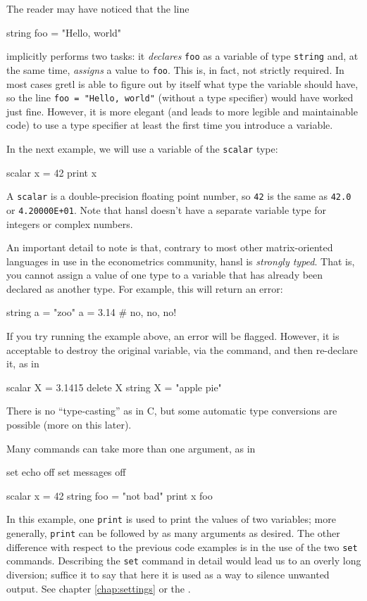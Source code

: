 The reader may have noticed that the line 
\begin{code}
  string foo = "Hello, world"
\end{code}
implicitly performs two tasks: it \emph{declares} \texttt{foo} as a
variable of type \texttt{string} and, at the same time, \emph{assigns}
a value to \texttt{foo}. This is, in fact, not strictly required.  In
most cases gretl is able to figure out by itself what type the
variable should have, so the line \verb|foo = "Hello, world"| (without
a type specifier) would have worked just fine.  However, it is more
elegant (and leads to more legible and maintainable code) to use a
type specifier at least the first time you introduce a variable.
  
In the next example, we will use a variable of the \texttt{scalar}
type:
\begin{code}
  scalar x = 42
  print x
\end{code}
A \texttt{scalar} is a double-precision floating point number, so
\texttt{42} is the same as \texttt{42.0} or \texttt{4.20000E+01}. Note
that hansl doesn't have a separate variable type for integers or
complex numbers.

An important detail to note is that, contrary to most other
matrix-oriented languages in use in the econometrics community, hansl
is \emph{strongly typed}. That is, you cannot assign a value of one
type to a variable that has already been declared as another type. For
example, this will return an error:
\begin{code}
  string a = "zoo"
  a = 3.14 # no, no, no!
\end{code}
If you try running the example above, an error will be
flagged. However, it is acceptable to destroy the original variable,
via the  command, and then re-declare it, as in
\begin{code}
  scalar X = 3.1415
  delete X
  string X = "apple pie"
\end{code}

There is no ``type-casting'' as in C, but some automatic type
conversions are possible (more on this later).

Many commands can take more than one argument, as in
\begin{code}
  set echo off
  set messages off

  scalar x = 42
  string foo = "not bad"
  print x foo 
\end{code}
In this example, one \texttt{print} is used to print the values of two
variables; more generally, \texttt{print} can be followed by as many
arguments as desired. The other difference with respect to the
previous code examples is in the use of the two \texttt{set}
commands. Describing the \texttt{set} command in detail would lead us
to an overly long diversion; suffice it to say that here it is used as
a way to silence unwanted output. See chapter \ref{chap:settings} or
the \GCR{}.

